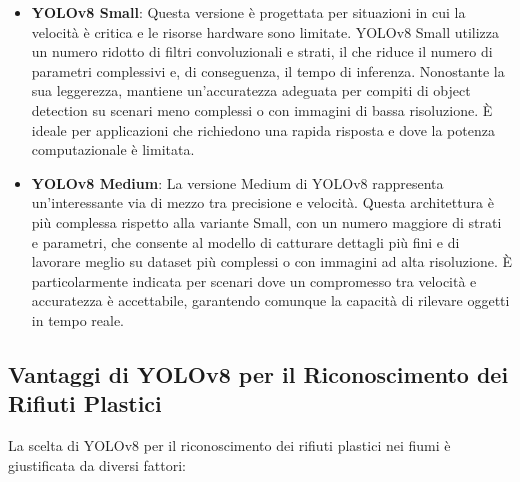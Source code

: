 \begin{itemize}
    \item \textbf{YOLOv8 Small}: Questa versione è progettata per situazioni in cui la velocità è critica e le risorse hardware sono limitate. YOLOv8 Small utilizza un numero ridotto di filtri convoluzionali e strati, il che riduce il numero di parametri complessivi e, di conseguenza, il tempo di inferenza. Nonostante la sua leggerezza, mantiene un'accuratezza adeguata per compiti di object detection su scenari meno complessi o con immagini di bassa risoluzione. È ideale per applicazioni che richiedono una rapida risposta e dove la potenza computazionale è limitata.
    
    \item \textbf{YOLOv8 Medium}: La versione Medium di YOLOv8 rappresenta un'interessante via di mezzo tra precisione e velocità. Questa architettura è più complessa rispetto alla variante Small, con un numero maggiore di strati e parametri, che consente al modello di catturare dettagli più fini e di lavorare meglio su dataset più complessi o con immagini ad alta risoluzione. È particolarmente indicata per scenari dove un compromesso tra velocità e accuratezza è accettabile, garantendo comunque la capacità di rilevare oggetti in tempo reale.
\end{itemize}

\subsection{Vantaggi di YOLOv8 per il Riconoscimento dei Rifiuti Plastici}

La scelta di YOLOv8 per il riconoscimento dei rifiuti plastici nei fiumi è giustificata da diversi fattori:

